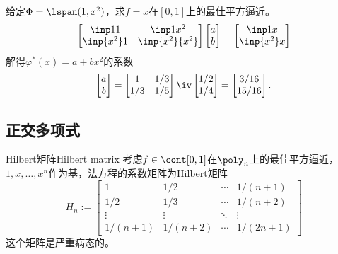 \begin{example}
    {}{}
    给定$\Phi=\lspan(1,x^2)$，求$f=x$在$[0,1]$上的最佳平方逼近。
    \[
        \begin{bmatrix}
            \inp11&\inp1{x^2}\\
            \inp{x^2}1&\inp{x^2}{x^2}
        \end{bmatrix}\begin{bmatrix}
            a\\b
        \end{bmatrix}=\begin{bmatrix}
            \inp1x\\\inp{x^2}x
        \end{bmatrix}
    \]
    解得$\varphi^*(x)=a+bx^2$的系数
    \[
        \begin{bmatrix}
            a\\b
        \end{bmatrix}=\begin{bmatrix}
            1&1/3\\1/3&1/5
        \end{bmatrix}\iv\begin{bmatrix}
            1/2\\1/4
        \end{bmatrix}=\begin{bmatrix}
            3/16\\15/16
        \end{bmatrix}.
    \]
\end{example}

\subsection{正交多项式}

\begin{definition}
    {Hilbert矩阵}{Hilbert matrix}
    考虑$f\in\cont[0,1]$在$\poly_n$上的最佳平方逼近，$1,x,\ldots,x^n$作为基，法方程的系数矩阵为Hilbert矩阵
    \begin{equation}
        H_n:=\begin{bmatrix}
            1&1/2&\cdots&1/(n+1)\\
            1/2&1/3&\cdots&1/(n+2)\\
            \vdots&\vdots&\ddots&\vdots\\
            1/(n+1)&1/(n+2)&\cdots&1/(2n+1)
        \end{bmatrix}
    \end{equation}
    这个矩阵是严重病态的。
\end{definition}

